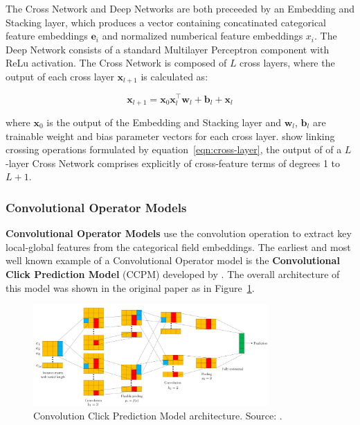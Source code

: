 \documentclass{mldsmsc}
\begin{document}
The Cross Network and Deep Networks are both preceeded by an Embedding and Stacking layer, which produces
a vector containing concatinated categorical feature embeddings $\mathbf{e}_i$ and normalized numberical
feature embeddings $x_i$. The Deep Network consists of a standard Multilayer Perceptron component with
ReLu activation. The Cross Network is composed of $L$ cross layers, where the output of each
cross layer $\mathbf{x}_{l+1}$ is calculated as:

\begin{equation}\label{eqn:cross-layer}
    \mathbf{x}_{l+1} = \mathbf{x}_0 \mathbf{x}_l^{\intercal} \mathbf{w}_l + \mathbf{b}_l + \mathbf{x}_l
\end{equation}

where $\mathbf{x}_0$ is the output of the Embedding and Stacking layer and $\mathbf{w}_l$, $\mathbf{b}_l$
are trainable weight and bias parameter vectors for each cross layer. \cite{RefWorks:wang2017deep}
show linking crossing operations formulated by equation~\ref{eqn:cross-layer}, the output of of a
$L$-layer Cross Network comprises explicitly of cross-feature terms of degrees 1 to $L+1$.

\subsubsection{Convolutional Operator Models}

\textbf{Convolutional Operator Models} use the convolution operation to extract key local-global
features from the categorical field embeddings. The earliest and most well known example of a
Convolutional Operator model is the \textbf{Convolutional Click Prediction Model} (CCPM)
developed by \cite{RefWorks:liu2015convolutional}. The overall architecture of this model
was shown in the original paper as in Figure~\ref{fig:ccpm}.

\begin{figure}[h]
    \centering
    \includegraphics[width=0.8\textwidth]{../figures/ccpm}
    \caption{Convolution Click Prediction Model architecture. Source: \citep{RefWorks:liu2015convolutional}.}
    \label{fig:ccpm}
\end{figure}
\end{document}
